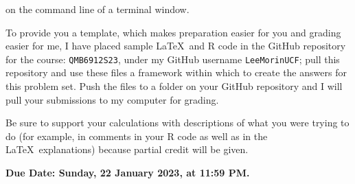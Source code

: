\documentclass[11pt]{article}
\begin{document}
\medskip\noindent
on the command line of a terminal window.

\bigskip
To provide you a template, which makes preparation easier for you and grading 
easier for me, I have placed sample \LaTeX\ and \textsf{R} code 
in the GitHub repository for the course: {\tt QMB6912S23},
under my GitHub username {\tt LeeMorinUCF};
pull this repository and use these files a framework within which to 
create the answers for this problem set.
Push the files to a folder on your GitHub repository
and I will pull your submissions to my computer for grading. 



\medskip
Be sure to support your calculations with descriptions 
of what you were trying to do (for example, in comments in your \textsf{R} code 
as well as in the \LaTeX\ explanations) because partial credit will be given.



\vfill
\centerline{\bf Due Date: Sunday, 22 January 2023, at 11:59 PM.}

\eject


\end{document}
